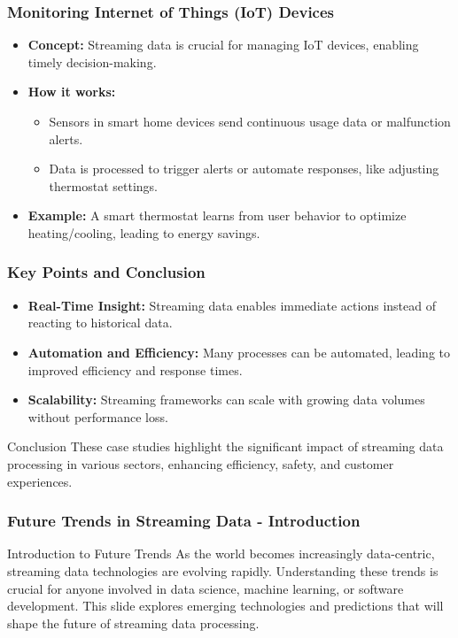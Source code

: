 \documentclass[aspectratio=169]{beamer}
\begin{document}
\begin{frame}[fragile]
    \frametitle{Monitoring Internet of Things (IoT) Devices}
    \begin{itemize}
        \item \textbf{Concept:} 
        Streaming data is crucial for managing IoT devices, enabling timely decision-making.
        
        \item \textbf{How it works:} 
        \begin{itemize}
            \item Sensors in smart home devices send continuous usage data or malfunction alerts.
            \item Data is processed to trigger alerts or automate responses, like adjusting thermostat settings.
        \end{itemize}
        
        \item \textbf{Example:} 
        A smart thermostat learns from user behavior to optimize heating/cooling, leading to energy savings.
    \end{itemize}
\end{frame}

\begin{frame}[fragile]
    \frametitle{Key Points and Conclusion}
    \begin{itemize}
        \item \textbf{Real-Time Insight:} 
        Streaming data enables immediate actions instead of reacting to historical data.
        
        \item \textbf{Automation and Efficiency:} 
        Many processes can be automated, leading to improved efficiency and response times.
        
        \item \textbf{Scalability:} 
        Streaming frameworks can scale with growing data volumes without performance loss.
    \end{itemize}
    
    \begin{block}{Conclusion}
        These case studies highlight the significant impact of streaming data processing in various sectors, enhancing efficiency, safety, and customer experiences.
    \end{block}
\end{frame}

\begin{frame}[fragile]
    \frametitle{Future Trends in Streaming Data - Introduction}
    \begin{block}{Introduction to Future Trends}
        As the world becomes increasingly data-centric, streaming data technologies are evolving rapidly. Understanding these trends is crucial for anyone involved in data science, machine learning, or software development. This slide explores emerging technologies and predictions that will shape the future of streaming data processing.
    \end{block}
\end{frame}
\end{document}
